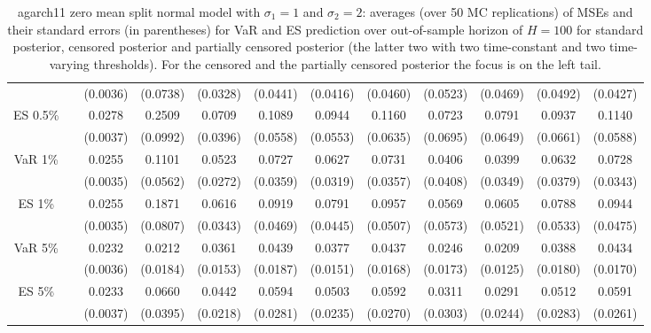 {{\begin{sidewaystable}
\begin{tabular}{cc cc | cccc | cccc}
  && (0.0036) & (0.0738) & (0.0328) & (0.0441) & (0.0416) & (0.0460) &(0.0523) & (0.0469) & (0.0492) & (0.0427) \\ 
\rowcolor{LightCyan} 
ES 0.5\% && 0.0278 & 0.2509 & 0.0709 & 0.1089 & 0.0944 & 0.1160 &0.0723 & 0.0791 & 0.0937 & 0.1140 \\ 
  && (0.0037) & (0.0992) & (0.0396) & (0.0558) & (0.0553) & (0.0635) &(0.0695) & (0.0649) & (0.0661) & (0.0588) \\ [1ex] 
\rowcolor{LightCyan} 
VaR 1\% && 0.0255 & 0.1101 & 0.0523 & 0.0727 & 0.0627 & 0.0731 &0.0406 & 0.0399 & 0.0632 & 0.0728 \\   
 && (0.0035) & (0.0562) & (0.0272) & (0.0359) & (0.0319) & (0.0357) &(0.0408) & (0.0349) & (0.0379) & (0.0343) \\  
\rowcolor{LightCyan} 
ES 1\% && 0.0255 & 0.1871 & 0.0616 & 0.0919 & 0.0791 & 0.0957 &0.0569 & 0.0605 & 0.0788 & 0.0944 \\ 
  && (0.0035) & (0.0807) & (0.0343) & (0.0469) & (0.0445) & (0.0507) &(0.0573) & (0.0521) & (0.0533) & (0.0475) \\ [1ex]
\rowcolor{LightCyan} 
VaR 5\% && 0.0232 & 0.0212 & 0.0361 & 0.0439 & 0.0377 & 0.0437 &0.0246 & 0.0209 & 0.0388 & 0.0434 \\ 
  && (0.0036) & (0.0184) & (0.0153) & (0.0187) & (0.0151) & (0.0168) &(0.0173) & (0.0125) & (0.0180) & (0.0170) \\ 
\rowcolor{LightCyan} 
ES 5\% && 0.0233 & 0.0660 & 0.0442 & 0.0594 & 0.0503 & 0.0592 &0.0311 & 0.0291 & 0.0512 & 0.0591 \\ 
 && (0.0037) & (0.0395) & (0.0218) & (0.0281) & (0.0235) & (0.0270) &(0.0303) & (0.0244) & (0.0283) & (0.0261) \\ 
\hline 
\end{tabular}
 \caption{agarch11 zero mean split normal model with $\sigma_{1} = 1$ and $\sigma_{2} = 2$:  averages (over 50 MC replications) of MSEs and their standard errors (in parentheses)  for VaR and ES prediction over out-of-sample horizon of $H=100$  for standard posterior, censored posterior and partially censored posterior (the latter two with two time-constant and two time-varying thresholds).  For the censored and the partially censored posterior the focus is on the left tail.} 
\label{tab:agarch11_pcp_var}  
\end{sidewaystable}
}
}